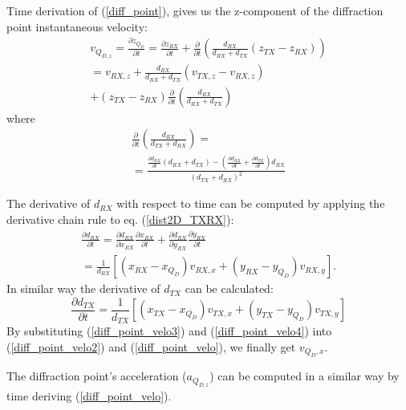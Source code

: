 Time derivation of (\ref{diff_point}), gives us the z-component of the diffraction point instantaneous velocity: 
	\begin{equation}
	\begin{gathered}
	v_{Q_{D,z}} = \frac{\partial z_{Q_D}}{\partial t} = \frac{\partial z_{RX}}{\partial t} + \frac{\partial }{\partial t} \left(\frac{d_{RX}}{d_{RX}+d_{TX}} (z_{TX}-z_{RX}) \right) \\
	= v_{RX,z} + \frac{d_{RX}}{d_{RX}+d_{TX}} \left(v_{TX,z}-v_{RX,z} \right)\\ 
	+ (z_{TX}-z_{RX}) \frac{\partial}{\partial t} \left(\frac{d_{RX}}{d_{RX}+d_{TX}} \right)
	\end{gathered}
	\label{diff_point_velo}
	\end{equation}
	where \\
	\begin{equation}
	\begin{multlined}
	\frac{\partial}{\partial t} \left(\frac{d_{RX}}{d_{TX}+d_{RX}} \right)= \\[2ex]
	=\frac{\frac{\partial d_{RX}}{\partial t} (d_{RX}+d_{TX})-\left(\frac{\partial d_{RX}}{\partial t} + \frac{\partial d_{TX}}{\partial t} \right) d_{RX}}{(d_{TX}+d_{RX})^2}
	\end{multlined}
	\label{diff_point_velo2}
	\end{equation}
    \par 
	The derivative of $d_{RX}$ with respect to time can be computed by applying the derivative chain rule to eq. (\ref{dist2D_TXRX}):
	\begin{equation}
	\begin{gathered}
	\frac{\partial d_{RX}}{\partial t} = \frac{\partial d_{RX}}{\partial x_{RX}} \frac{\partial x_{RX}}{\partial t} + \frac{\partial d_{RX}}{\partial y_{RX}} \frac{\partial y_{RX}}{\partial t} \\ 
	= \frac{1}{d_{RX}}\left[ \left(x_{RX}-x_{Q_D}\right) v_{RX,x}+  \left(y_{RX}-y_{Q_D}\right) v_{RX,y}\right].
	\end{gathered}
	\label{diff_point_velo3}
	\end{equation}
	In similar way the derivative of $d_{TX}$ can be calculated: 
	\begin{equation}
	\frac{\partial d_{TX}}{\partial t} = \frac{1}{d_{TX}}\left[ \left(x_{TX}-x_{Q_D}\right) v_{TX,x}+  \left(y_{TX}-y_{Q_D}\right) v_{TX,y}\right]
	\label{diff_point_velo4}
	\end{equation}
By substituting (\ref{diff_point_velo3}) and (\ref{diff_point_velo4}) into (\ref{diff_point_velo2}) and (\ref{diff_point_velo}), we finally get $v_{Q_D,x}$.\par
The diffraction point's acceleration ($a_{Q_{D,z}}$) can be computed in a similar way by time deriving (\ref{diff_point_velo}). 